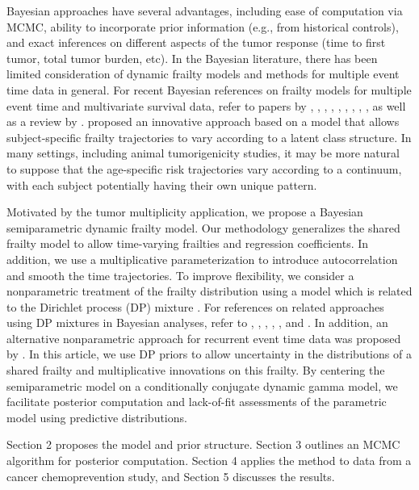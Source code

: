 \documentclass[10pt, letterpaper]{article}
\begin{document}
Bayesian approaches have several advantages, including ease of computation via MCMC, ability to incorporate prior information (e.g., from historical controls), and exact inferences on different aspects of the tumor response (time to first tumor, total tumor burden, etc). In the Bayesian literature, there has been limited consideration of dynamic frailty models and methods for multiple event time data in general. For recent Bayesian references on frailty models for multiple event time and multivariate survival data, refer to papers by \citet{Gustafson1997}, \citet{Sahu1997}, \citet{Walker1997}, \citet{Sargent1998}, \citet{Aslanidou1998}, \citet{Sinha1998}, \citet{Chen2002}, \citet{Dunson2004}, \citet{Sinha2004}, as well as a review by \citet{Ibrahim2001}. \citet{Harkanen2003} proposed an innovative approach based on a model that allows subject-specific frailty trajectories to vary according to a latent class structure. In many settings, including animal tumorigenicity studies, it may be more natural to suppose that the age-specific risk trajectories vary according to a continuum, with each subject potentially having their own unique pattern.

Motivated by the tumor multiplicity application, we propose a Bayesian semiparametric dynamic frailty model. Our methodology generalizes the shared frailty model to allow time-varying frailties and regression coefficients. In addition, we use a multiplicative parameterization to introduce autocorrelation and smooth the time trajectories. To improve flexibility, we consider a nonparametric treatment of the frailty distribution using a model which is related to the Dirichlet process (DP) mixture \citep{Antoniak1974}. For references on related approaches using DP mixtures in Bayesian analyses, refer to \citet{West1994}, \citet{Bush1996}, \citet{Mukhopadhyay1997}, \citet{Muller1997}, \citet{Kleinman1998}, and \citet{Dominici2001}. In addition, an alternative nonparametric approach for recurrent event time data was proposed by \citet{Ishwaran2004}. In this article, we use DP priors to allow uncertainty in the distributions of a shared frailty and multiplicative innovations on this frailty. By centering the semiparametric model on a conditionally conjugate dynamic gamma model, we facilitate posterior computation and lack-of-fit assessments of the parametric model using predictive distributions.

Section 2 proposes the model and prior structure. Section 3 outlines an MCMC algorithm for posterior computation. Section 4 applies the method to data from a cancer chemoprevention study, and Section 5 discusses the results.
\end{document}
